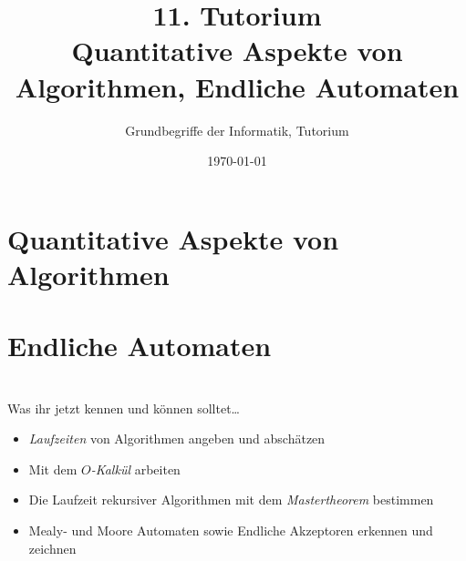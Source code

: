 




\usetikzlibrary{matrix}
\usetikzlibrary{arrows.meta}
\usetikzlibrary{automata}
\usetikzlibrary{tikzmark}

\title[Quantitative Aspekte von Algorithmen, Endliche Automaten]{11. Tutorium\\  Quantitative Aspekte von Algorithmen, Endliche Automaten}
\subtitle{Grundbegriffe der Informatik, Tutorium \hashtag\mytutnumber}
\date{\today}



\titleframe

\roadmap



\section{Quantitative Aspekte von Algorithmen}


\section{Endliche Automaten}


\section{}
	\begin{frame}{Was ihr jetzt kennen und können solltet\dots}
			\begin{itemize}
				\item \emph{Laufzeiten} von Algorithmen angeben und abschätzen
				\item Mit dem \emph{$O$-Kalkül} arbeiten
				\item Die Laufzeit rekursiver Algorithmen mit dem \emph{Mastertheorem} bestimmen
				\item Mealy- und Moore Automaten sowie Endliche Akzeptoren erkennen und zeichnen
			\end{itemize}
	
	\end{frame}
\section{}
\questionframe
\lastframe
{}

